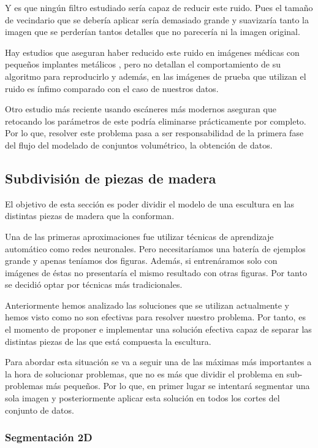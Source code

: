 Y es que ningún filtro estudiado sería capaz de reducir este ruido. Pues el tamaño de vecindario que se debería aplicar sería demasiado grande y suavizaría tanto la imagen que se perderían tantos detalles que no parecería ni la imagen original.

Hay estudios que aseguran haber reducido este ruido en imágenes médicas con pequeños implantes metálicos \cite{deman98} \cite{watzke04}, pero no detallan el comportamiento de su algoritmo para reproducirlo y además, en las imágenes de prueba que utilizan el ruido es ínfimo comparado con el caso de nuestros datos.

Otro estudio más reciente \cite{boas12} usando escáneres más modernos aseguran que retocando los parámetros de este podría eliminarse prácticamente por completo. Por lo que, resolver este problema pasa a ser responsabilidad de la primera fase del flujo del modelado de conjuntos volumétrico, la obtención de datos.

\subsection{Subdivisión de piezas de madera}

El objetivo de esta sección es poder dividir el modelo de una escultura en las distintas piezas de madera que la conforman.

Una de las primeras aproximaciones fue utilizar técnicas de aprendizaje automático como redes neuronales. Pero necesitaríamos una batería de ejemplos grande y apenas teníamos dos figuras. Además, si entrenáramos solo con imágenes de éstas no presentaría el mismo resultado con otras figuras. Por tanto se decidió optar por técnicas más tradicionales. 

Anteriormente hemos analizado las soluciones que se utilizan actualmente y hemos visto como no son efectivas para resolver nuestro problema. Por tanto, es el momento de proponer e implementar una solución efectiva capaz de separar las distintas piezas de las que está compuesta la escultura.

Para abordar esta situación se va a seguir una de las máximas más importantes a la hora de solucionar problemas, que no es más que dividir el problema en sub-problemas más pequeños. Por lo que, en primer lugar se intentará segmentar una sola imagen y posteriormente aplicar esta solución en todos los cortes del conjunto de datos.

\subsubsection{Segmentación 2D}

